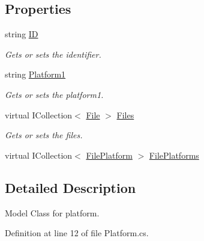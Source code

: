 \subsection*{Properties}
\begin{DoxyCompactItemize}
\item 
string \hyperlink{class_open_1_1_g_i_1_1hypermart_1_1_models_1_1_platform_ae11ad27de467131d539e35f598ff3051}{I\+D}
\begin{DoxyCompactList}\small\item\em Gets or sets the identifier. \end{DoxyCompactList}\item 
string \hyperlink{class_open_1_1_g_i_1_1hypermart_1_1_models_1_1_platform_aa93619cbb18655b2425f416df0f194c6}{Platform1}
\begin{DoxyCompactList}\small\item\em Gets or sets the platform1. \end{DoxyCompactList}\item 
virtual I\+Collection$<$ \hyperlink{class_open_1_1_g_i_1_1hypermart_1_1_models_1_1_file}{File} $>$ \hyperlink{class_open_1_1_g_i_1_1hypermart_1_1_models_1_1_platform_a984a31b30ada1f33acef9099c09d9ca0}{Files}
\begin{DoxyCompactList}\small\item\em Gets or sets the files. \end{DoxyCompactList}\item 
virtual I\+Collection$<$ \hyperlink{class_open_1_1_g_i_1_1hypermart_1_1_models_1_1_file_platform}{File\+Platform} $>$ \hyperlink{class_open_1_1_g_i_1_1hypermart_1_1_models_1_1_platform_ac358f8b1b556f6d99fb47fdb29de7202}{File\+Platforms}
\end{DoxyCompactItemize}


\subsection{Detailed Description}
Model Class for platform. 



Definition at line 12 of file Platform.\+cs.



